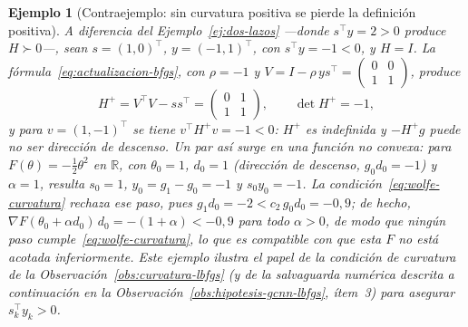 \documentclass[a4paper,openany,oneside,10pt]{report}
\theoremstyle{pnlTeorema}
\theoremstyle{pnlDefinicion}
\theoremstyle{pnlObservacion}
\newtheorem{ejemplo}{Ejemplo}[section]
\begin{document}
\begin{ejemplo}[Contraejemplo: sin curvatura positiva se pierde la definición positiva]\label{ej:contraejemplo-curvatura}
A diferencia del Ejemplo~\ref{ej:dos-lazos} —donde $s^\top y=2>0$ produce $H\succ 0$—, sean $s=(1,0)^\top$, $y=(-1,1)^\top$, con $s^\top y=-1<0$, y $H=I$. La fórmula~\eqref{eq:actualizacion-bfgs}, con $\rho=-1$ y $V=I-\rho\,ys^\top=\begin{pmatrix}0&0\\1&1\end{pmatrix}$, produce
\[
H^+=V^\top V-ss^\top=\begin{pmatrix}0&1\\1&1\end{pmatrix},\qquad \det H^+=-1,
\]
y para $v=(1,-1)^\top$ se tiene $v^\top H^+v=-1<0$: $H^+$ es indefinida y $-H^+g$ puede no ser dirección de descenso. Un par así surge en una función no convexa: para $F(\theta)=-\frac12\theta^2$ en $\mathbb{R}$, con $\theta_0=1$, $d_0=1$ (dirección de descenso, $g_0d_0=-1$) y $\alpha=1$, resulta $s_0=1$, $y_0=g_1-g_0=-1$ y $s_0y_0=-1$. La condición~\eqref{eq:wolfe-curvatura} rechaza ese paso, pues $g_1d_0=-2<c_2\,g_0d_0=-0{,}9$; de hecho, $\nabla F(\theta_0+\alpha d_0)\,d_0=-(1+\alpha)<-0{,}9$ para todo $\alpha>0$, de modo que ningún paso cumple~\eqref{eq:wolfe-curvatura}, lo que es compatible con que esta $F$ no está acotada inferiormente. Este ejemplo ilustra el papel de la condición de curvatura de la Observación~\ref{obs:curvatura-lbfgs} (y de la salvaguarda numérica descrita a continuación en la Observación~\ref{obs:hipotesis-gcnn-lbfgs}, ítem~3) para asegurar $s_k^\top y_k>0$.
\end{ejemplo}
\end{document}
